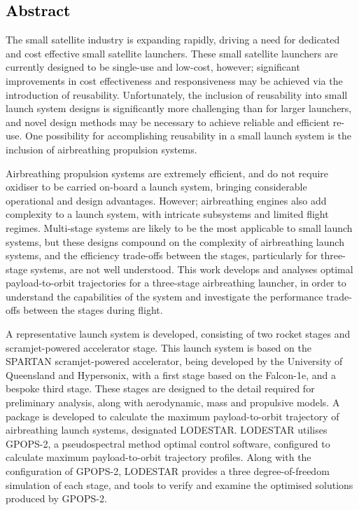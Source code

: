 \cleardoublepage
\textcolor{black}{
\section*{Abstract}
}
\noindent
 The small satellite industry is expanding rapidly, driving a need for dedicated and cost effective small satellite launchers.  
These small satellite launchers are currently designed to be single-use and low-cost, however; significant improvements in cost effectiveness and responsiveness may be achieved via the introduction of reusability. Unfortunately, the inclusion of reusability into small launch system designs is significantly more challenging than for larger launchers, and novel design methods may be necessary to achieve reliable and efficient re-use. One possibility for accomplishing reusability in a small launch system is the inclusion of airbreathing propulsion systems.

Airbreathing propulsion systems are extremely efficient, and do not require oxidiser to be carried on-board a launch system, bringing considerable operational and design advantages. 
However; airbreathing engines also add complexity to a launch system, with intricate subsystems and limited flight regimes. 
Multi-stage systems are likely to be the most applicable to small launch systems, but these designs compound on the complexity of airbreathing launch systems, and the efficiency trade-offs between the stages, particularly for three-stage systems, are not well understood. This work develops and analyses optimal payload-to-orbit trajectories for a three-stage airbreathing launcher, in order to understand the capabilities of the system and investigate the performance trade-offs between the stages during flight.



 A representative launch system is developed, consisting of two rocket stages and scramjet-powered accelerator stage.
This launch system is based on the SPARTAN scramjet-powered accelerator, being developed by the University of Queensland and Hypersonix, with a first stage based on the Falcon-1e, and a bespoke third stage. These stages are designed to the detail required for preliminary analysis, along with aerodynamic, mass and propulsive models.
 A package is developed to calculate the maximum payload-to-orbit trajectory of airbreathing launch systems, designated LODESTAR. LODESTAR utilises GPOPS-2, a pseudospectral method optimal control software, configured to calculate maximum payload-to-orbit trajectory profiles. Along with the configuration of GPOPS-2, LODESTAR provides a three degree-of-freedom simulation of each stage, and tools to verify and examine the optimised solutions produced by GPOPS-2.


